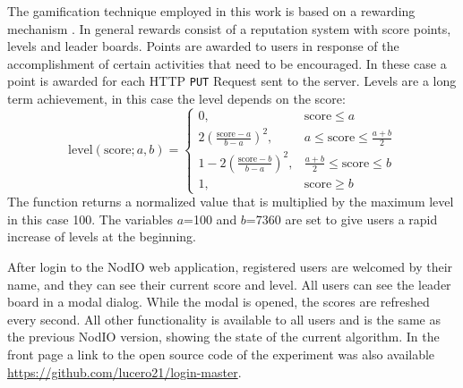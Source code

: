 \documentclass{llncs}
\begin{document}
The gamification technique employed in this work is based on a rewarding mechanism
\cite{dubois2013understanding}. In general rewards  consist of a reputation system
with score points, levels and leader boards. Points are awarded to users in response of
the accomplishment of certain activities that need to be encouraged. In these case
a point is awarded for each HTTP {\tt PUT} Request sent to the server. Levels are a long
term achievement, in this case the level depends on the score:
\[ \text{level}(\text{score};a,b)=
    \begin{cases}
      0,                                    &  \text{score}\leq a\\
      2(\frac{\text{score}-a}{b-a})^{2},    &  a\leq \text{score}\leq \frac{a+b}{2}\\
      1-2(\frac{\text{score}-b}{b-a})^{2},  & \frac{a+b}{2} \leq \text{score}\leq b\\
      1,                                    & \text{score}\geq b
   \end{cases}
\]
The function returns a normalized value that is multiplied by the maximum level
in this case 100. The variables $a$=100 and $b$=7360 are set to give users a rapid increase of
levels at the beginning.%
%

After login to the NodIO web application, %
registered users are welcomed by their name, and they can see
their current score and level. All users can see the
leader board in a modal dialog.
While the modal is opened, the scores are refreshed every second. All other
functionality is available to all users and is the same as the
previous {\sf NodIO} version, showing the state of the current algorithm.
In the front page a link to the open source code of the experiment was also
available \url{https://github.com/lucero21/login-master}. %
\end{document}
